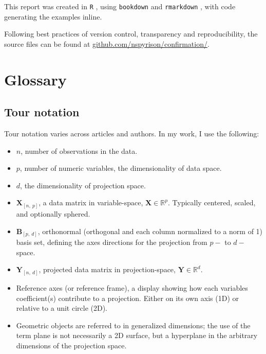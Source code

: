 \documentclass{monashthesis}
\begin{document}
This report was created in \texttt{R} \autocite{r_core_team_r:_2018},
using \texttt{bookdown} \autocite{xie_bookdown:_2016} and
\texttt{rmarkdown} \autocite{xie_r_2018}, with code generating the
examples inline.

Following best practices of version control, transparency and
reproducibility, the source files can be found at
\href{https://github.com/nspyrison/Confirmation}{github.com/nspyrison/confirmation/}.

\appendix

\chapter{Glossary}\label{ch:glossary}

\section{Tour notation}\label{sec:tour_notation}

Tour notation varies across articles and authors. In my work, I use the
following:

\begin{itemize}
\tightlist
\item
  \(n\), number of observations in the data.
\item
  \(p\), number of numeric variables, the dimensionality of data space.
\item
  \(d\), the dimensionality of projection space.
\item
  \(\textbf{X}_{[n,~p]}\), a data matrix in variable-space,
  \(\textbf{X} \in \mathbb{R}^{p}\). Typically centered, scaled, and
  optionally sphered.
\item
  \(\textbf{B}_{[p,~d]}\), orthonormal (orthogonal and each column
  normalized to a norm of 1) basis set, defining the axes directions for
  the projection from \(p-\) to \(d-\)space.
\item
  \(\textbf{Y}_{[n,~d]}\), projected data matrix in projection-space,
  \(\textbf{Y} \in \mathbb{R}^{d}\).
\item
  Reference axes (or reference frame), a display showing how each
  variables coefficient(s) contribute to a projection. Either on its own
  axis (1D) or relative to a unit circle (2D).
\item
  Geometric objects are referred to in generalized dimensions; the use
  of the term plane is not necessarily a 2D surface, but a hyperplane in
  the arbitrary dimensions of the projection space.
\end{itemize}
\end{document}
